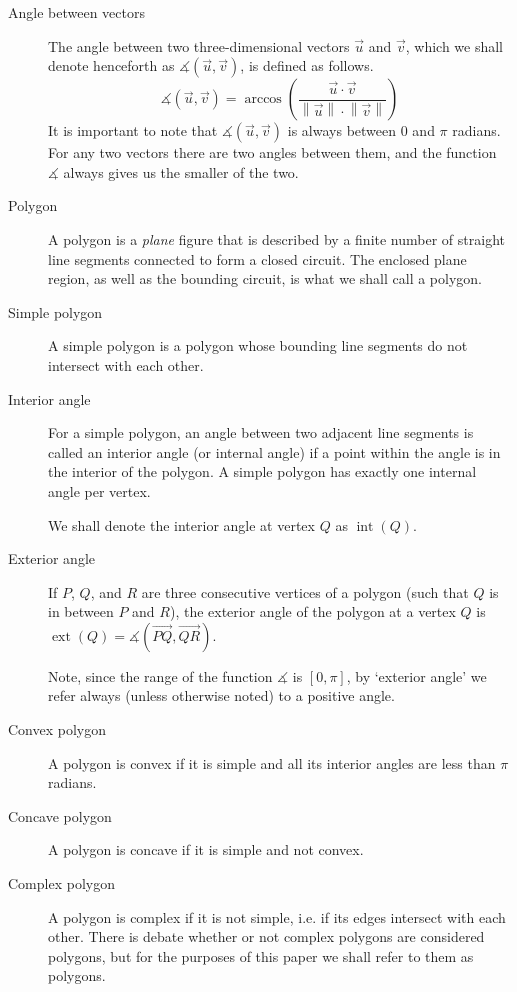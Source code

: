 \documentclass{article}
\newcommand{\vecl}{\overrightarrow} %
\newcommand{\ang}[1]{\measuredangle\left( #1 \right)}
\newcommand{\len}[1]{\left\lVert #1 \right\rVert}
\newcommand{\inta}[1]{\operatorname{int}\left( #1 \right)} %
\newcommand{\exta}[1]{\operatorname{ext}\left( #1 \right)} %
\begin{document}
\begin{description}
	\item[Angle between vectors]
		The angle between two three-dimensional vectors \(\vec{u}\) and \(\vec{v}\), which we shall denote henceforth as \(\ang{\vec{u}, \vec{v}}\), is defined as follows.
		\begin{equation*}
			\ang{\vec{u}, \vec{v}} = \arccos \left( \frac{\vec{u} \cdot \vec{v}} {\len{\vec{u}} \cdot \len{\vec{v}}} \right)
		\end{equation*}
		It is important to note that \(\ang{\vec{u}, \vec{v}}\) is always between 0 and \(\pi\) radians. For any two vectors there are two angles between them, and the function \(\measuredangle\) always gives us the smaller of the two.

	\item[Polygon]
		A polygon is a \emph{plane} figure that is described by a finite number of straight line segments connected to form a closed circuit. The enclosed plane region, as well as the bounding circuit, is what we shall call a polygon.

	\item[Simple polygon]
		A simple polygon is a polygon whose bounding line segments do not intersect with each other.

	\item[Interior angle]
		For a simple polygon, an angle between two adjacent line segments is called an interior angle (or internal angle) if a point within the angle is in the interior of the polygon. A simple polygon has exactly one internal angle per vertex.

		We shall denote the interior angle at vertex \(Q\) as \(\inta{Q}\).

	\item[Exterior angle]
		If \(P\), \(Q\), and \(R\) are three consecutive vertices of a polygon (such that \(Q\) is in between \(P\) and \(R\)), the exterior angle of the polygon at a vertex \(Q\) is \(\exta{Q} = \ang{\vecl{PQ}, \vecl{QR}}\).

		Note, since the range of the function \(\measuredangle\) is \([0, \pi]\), by `exterior angle' we refer always (unless otherwise noted) to a positive angle.

	\item[Convex polygon]
		A polygon is convex if it is simple and all its interior angles are less than \(\pi\) radians.

	\item[Concave polygon]
		A polygon is concave if it is simple and not convex.

	\item[Complex polygon]
		A polygon is complex if it is not simple, i.e. if its edges intersect with each other. There is debate whether or not complex polygons are considered polygons, but for the purposes of this paper we shall refer to them as polygons.
\end{description}
\end{document}
